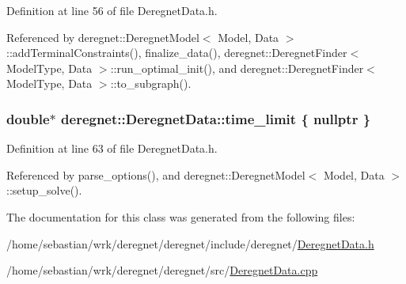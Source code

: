 Definition at line 56 of file Deregnet\+Data.\+h.



Referenced by deregnet\+::\+Deregnet\+Model$<$ Model, Data $>$\+::add\+Terminal\+Constraints(), finalize\+\_\+data(), deregnet\+::\+Deregnet\+Finder$<$ Model\+Type, Data $>$\+::run\+\_\+optimal\+\_\+init(), and deregnet\+::\+Deregnet\+Finder$<$ Model\+Type, Data $>$\+::to\+\_\+subgraph().

\subsubsection[{\texorpdfstring{time\+\_\+limit}{time_limit}}]{\setlength{\rightskip}{0pt plus 5cm}double$\ast$ deregnet\+::\+Deregnet\+Data\+::time\+\_\+limit \{ nullptr \}}\hypertarget{classderegnet_1_1DeregnetData_ac378faf7e8466135b8dc0ced907d98ae}{}\label{classderegnet_1_1DeregnetData_ac378faf7e8466135b8dc0ced907d98ae}


Definition at line 63 of file Deregnet\+Data.\+h.



Referenced by parse\+\_\+options(), and deregnet\+::\+Deregnet\+Model$<$ Model, Data $>$\+::setup\+\_\+solve().



The documentation for this class was generated from the following files\+:\begin{DoxyCompactItemize}
\item 
/home/sebastian/wrk/deregnet/deregnet/include/deregnet/\hyperlink{DeregnetData_8h}{Deregnet\+Data.\+h}\item 
/home/sebastian/wrk/deregnet/deregnet/src/\hyperlink{DeregnetData_8cpp}{Deregnet\+Data.\+cpp}\end{DoxyCompactItemize}

